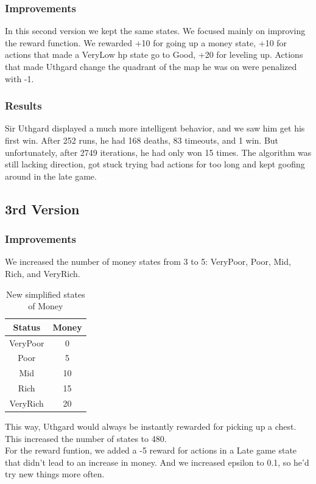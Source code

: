 \documentclass{article}
\begin{document}
  \subsubsection{Improvements}

  In this second version we kept the same states. We focused mainly on improving the reward function.
  We rewarded +10 for going up a money state, +10 for actions that made a VeryLow hp state go to Good, +20 for leveling up. 
  Actions that made Uthgard change the quadrant of the map he was on were penalized with -1.

  \subsubsection{Results}

  Sir Uthgard displayed a much more intelligent behavior, and we saw him get his first win. After 252 runs, he had 168 deaths, 83 timeouts, and 1 win. 
  But unfortunately, after 2749 iterations, he had only won 15 times. The algorithm was still lacking direction, got stuck trying bad actions for too long and kept goofing around in the late game.

  \subsection{3rd Version}

  \subsubsection{Improvements}

  We increased the number of money states from 3 to 5: VeryPoor, Poor, Mid, Rich, and VeryRich. 
  
  \begin{table}[h!]
    \centering
    \caption{New simplified states of Money}
    \label{tab:moneyStates2}
    \begin{tabular}{c|c}
      \textbf{Status} & \textbf{Money}\\
      \hline
      VeryPoor & 0\\
      Poor & 5\\
      Mid & 10\\
      Rich &  15\\
      VeryRich & 20\\
    \end{tabular}
  \end{table}
  \noindent
  This way, Uthgard would always be instantly rewarded for picking up a chest. This increased the number of states to 480. \\
  For the reward funtion, we added a -5 reward for actions in a Late game state that didn't lead to an increase in money. And we increased epsilon to 0.1, so he'd try new things more often.
\end{document}
